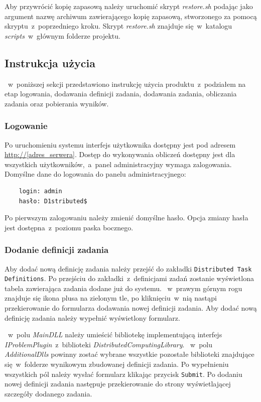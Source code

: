 \documentclass[a4paper,11pt,twoside]{report}
\theoremstyle{definition}
\begin{document}
            Aby przywrócić kopię zapasową należy uruchomić skrypt \textit{restore.sh} podając jako argument nazwę archiwum zawierającego kopię zapasową, stworzonego za pomocą skryptu~z~poprzedniego kroku. Skrypt \textit{restore.sh} znajduje się~w~katalogu \textit{scripts}~w~głównym folderze projektu.
            
    \subsection{Instrukcja użycia}
       ~w~poniższej sekcji przedstawiono instrukcję użycia produktu~z~podziałem na etap logowania, dodawania definicji zadania, dodawania zadania, obliczania zadania oraz pobierania wyników.
        
        \subsubsection{Logowanie}
        
        Po uruchomieniu systemu interfejs użytkownika dostępny jest pod adresem \url{http://[adres_serwera]}. Dostęp do wykonywania obliczeń dostępny jest dla wszystkich użytkowników,~a~panel administracyjny wymaga zalogowania.
        Domyślne dane do logowania do panelu administracyjnego:

        \begin{verbatim}
    login: admin
    hasło: D1stributed$
        \end{verbatim}


        Po pierwszym zalogowaniu należy zmienić domyślne hasło. Opcja zmiany hasła jest dostępna~z~poziomu paska bocznego.
        
        \subsubsection{Dodanie definicji zadania}
        \label{distributed-task-definition-add-guide}
        
        Aby dodać nową definicję zadania należy przejść do zakładki \texttt{Distributed Task Definitions}. 
        Po przejściu do zakładki~z~definicjami zadań zostanie wyświetlona tabela zawierająca zadania dodane już do systemu. 
       ~w~prawym górnym rogu znajduje się ikona plusa na zielonym tle, po kliknięciu~w~nią nastąpi przekierowanie do formularza dodawania nowej definicji zadania.
        Aby dodać nową definicję zadania należy wypełnić wyświetlony formularz.
        
       ~w~polu \textit{MainDLL} należy umieścić bibliotekę implementującą interfejs \textit{IProblemPlugin}~z~biblioteki \textit{DistributedComputingLibrary}.
       ~w~polu \textit{AdditionalDlls} powinny zostać wybrane wszystkie pozostałe biblioteki znajdujące się~w~folderze wynikowym zbudowanej definicji zadania.
        Po wypełnieniu wszystkich pól należy wysłać formularz klikając przycisk \texttt{Submit}.
        Po dodaniu nowej definicji zadania następuje przekierowanie do strony wyświetlającej szczegóły dodanego zadania. 
        
\end{document}
